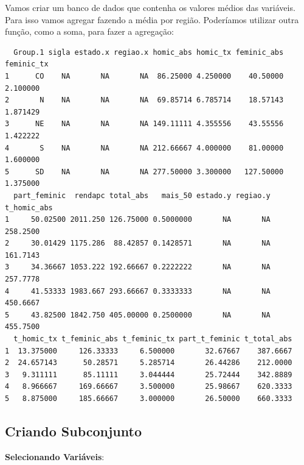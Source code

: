\documentclass[
  letterpaper,
  DIV=11,
  numbers=noendperiod]{scrreprt}
\newenvironment{Shaded}{\begin{snugshade}}{\end{snugshade}}
\newcommand{\AttributeTok}[1]{\textcolor[rgb]{0.40,0.45,0.13}{#1}}
\newcommand{\ConstantTok}[1]{\textcolor[rgb]{0.56,0.35,0.01}{#1}}
\newcommand{\FunctionTok}[1]{\textcolor[rgb]{0.28,0.35,0.67}{#1}}
\newcommand{\NormalTok}[1]{\textcolor[rgb]{0.00,0.23,0.31}{#1}}
\newcommand{\OtherTok}[1]{\textcolor[rgb]{0.00,0.23,0.31}{#1}}
\newcommand{\SpecialCharTok}[1]{\textcolor[rgb]{0.37,0.37,0.37}{#1}}
\begin{document}
Vamos criar um banco de dados que contenha os valores médios das
variáveis. Para isso vamos agregar fazendo a média por região.
Poderíamos utilizar outra função, como a soma, para fazer a agregação:

\begin{Shaded}
\end{Shaded}

\begin{verbatim}
  Group.1 sigla estado.x regiao.x homic_abs homic_tx feminic_abs feminic_tx
1      CO    NA       NA       NA  86.25000 4.250000    40.50000   2.100000
2       N    NA       NA       NA  69.85714 6.785714    18.57143   1.871429
3      NE    NA       NA       NA 149.11111 4.355556    43.55556   1.422222
4       S    NA       NA       NA 212.66667 4.000000    81.00000   1.600000
5      SD    NA       NA       NA 277.50000 3.300000   127.50000   1.375000
  part_feminic  rendapc total_abs   mais_50 estado.y regiao.y t_homic_abs
1     50.02500 2011.250 126.75000 0.5000000       NA       NA    258.2500
2     30.01429 1175.286  88.42857 0.1428571       NA       NA    161.7143
3     34.36667 1053.222 192.66667 0.2222222       NA       NA    257.7778
4     41.53333 1983.667 293.66667 0.3333333       NA       NA    450.6667
5     43.82500 1842.750 405.00000 0.2500000       NA       NA    455.7500
  t_homic_tx t_feminic_abs t_feminic_tx part_t_feminic t_total_abs
1  13.375000     126.33333     6.500000       32.67667    387.6667
2  24.657143      50.28571     5.285714       26.44286    212.0000
3   9.311111      85.11111     3.044444       25.72444    342.8889
4   8.966667     169.66667     3.500000       25.98667    620.3333
5   8.875000     185.66667     3.000000       26.50000    660.3333
\end{verbatim}

\subsection{Criando Subconjunto}\label{criando-subconjunto}

\textbf{Selecionando Variáveis}:
\end{document}
